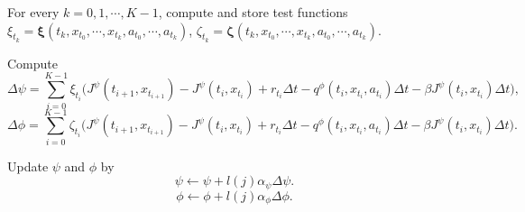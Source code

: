 \documentclass[11pt]{article}
\newcommand{\bm}[1]{\boldsymbol{#1}}
\newcommand{\1}{\mathbbm{1}}
\begin{document}
\begin{algorithm}[hbtp]
\begin{algorithmic}
{{}

For every $k = 0,1,\cdots,K-1$, compute and store test functions $\xi_{t_k} = \bm{\xi}(t_k, x_{t_0},\cdots, x_{t_k},a_{t_0},\cdots, a_{t_k})$, $\zeta_{t_k} = \bm{\zeta}(t_k, x_{t_0},\cdots, x_{t_k},a_{t_0},\cdots, a_{t_k})$.	

Compute
\[ \Delta\psi = \sum_{i=0}^{K-1} \xi_{t_i} \big(J^{\psi}(t_{i+1},x_{t_{i+1}}) - J^{\psi}(t_{i},x_{t_{i}}) + r_{t_i}\Delta t -q^{\phi}(t_{i},x_{t_{i}},a_{t_i})\Delta t - \beta J^{\psi}(t_{i},x_{t_{i}}) \Delta t  \big), \]
\[
\Delta\phi =   \sum_{i=0}^{K-1}\zeta_{t_i}\big( J^{\psi}(t_{i+1},x_{t_{i+1}}) - J^{\psi}(t_{i},x_{t_{i}}) + r_{t_i}\Delta t - q^{\phi}(t_{i},x_{t_{i}},a_{t_i})\Delta t - \beta J^{\psi}(t_{i},x_{t_{i}}) \Delta t\big) .
\]

Update $\psi$ and $\phi$ by
\[ \psi \leftarrow \psi + l(j)\alpha_{\psi} \Delta\psi .\]
\[ \phi \leftarrow \phi + l(j)\alpha_{\phi} \Delta\phi .  \]

}
\ENDFOR
\end{algorithmic}
\label{algo:offline episodic}
\end{algorithm}
\end{document}
